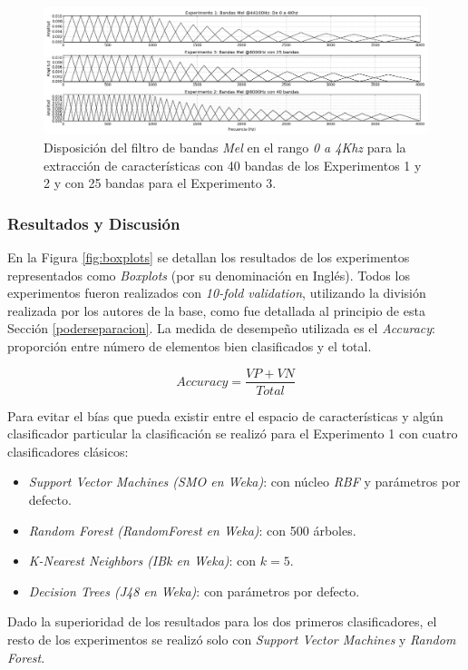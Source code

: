 \documentclass{article}
\begin{document}
\begin{figure}[h]
\begin{center}
\includegraphics[width=1\textwidth]{bandasmel2} 
\caption{Disposición del filtro de bandas \textit{Mel} en el rango \textit{0 a 4Khz} para la extracción de características con 40 bandas de los Experimentos 1 y 2 y con 25 bandas para el Experimento 3.}
\label{fig:bandasmel2}
\end{center}
\end{figure}

\subsubsection{Resultados y Discusión}

En la Figura \ref{fig:boxplots} se detallan los resultados de los experimentos representados como \textit{Boxplots} (por su denominación en Inglés). Todos los experimentos fueron realizados con \textit{10-fold validation}, utilizando la división realizada por los autores de la base, como fue detallada al principio de esta Sección \ref{poderseparacion}. La medida de desempeño utilizada es el \textit{Accuracy}: proporción entre número de elementos bien clasificados y el total. 


\begin{equation}
\textit{Accuracy} = \frac{VP + VN}{\textit{Total}}
\end{equation}


Para evitar el bías que pueda existir entre el espacio de características y algún clasificador particular la clasificación se realizó para el Experimento 1 con cuatro clasificadores clásicos:

\begin{itemize}
  \item \textit{Support Vector Machines (SMO en Weka)}: con núcleo \textit{RBF} y parámetros por defecto.
  \item \textit{Random Forest (RandomForest en Weka)}: con 500 árboles.
  \item \textit{K-Nearest Neighbors (IBk en Weka)}: con $k=5$.
  \item \textit{Decision Trees (J48 en Weka)}: con parámetros por defecto.
\end{itemize}
Dado la superioridad de los resultados para los dos primeros clasificadores, el resto de los experimentos se realizó solo con \textit{Support Vector Machines} y \textit{Random Forest}. 
\end{document}
